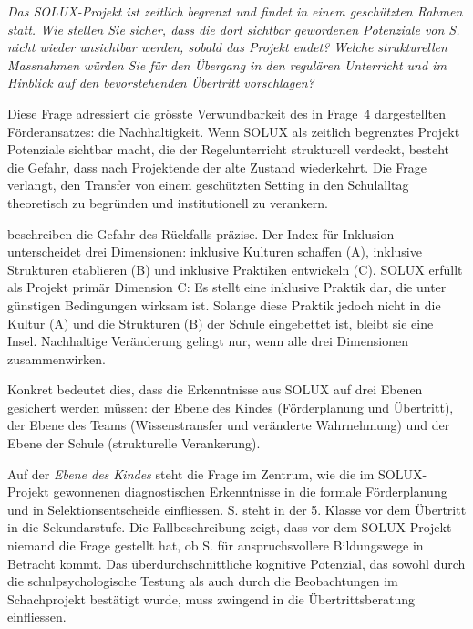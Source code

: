 \documentclass[ngerman, a4paper]{article}
\begin{document}
\begin{tcolorbox}[colback=gray!5, colframe=gray!50, title=Weiterführende Diskurslinie]
\itshape
Das SOLUX-Projekt ist zeitlich begrenzt und findet in einem geschützten Rahmen statt.
Wie stellen Sie sicher, dass die dort sichtbar gewordenen Potenziale von S. nicht
wieder unsichtbar werden, sobald das Projekt endet? Welche strukturellen Massnahmen
würden Sie für den Übergang in den regulären Unterricht und im Hinblick auf den
bevorstehenden Übertritt vorschlagen?
\end{tcolorbox}

Diese Frage adressiert die grösste Verwundbarkeit des in Frage~4 dargestellten
Förderansatzes: die Nachhaltigkeit. Wenn SOLUX als zeitlich begrenztes Projekt
Potenziale sichtbar macht, die der Regelunterricht strukturell verdeckt, besteht die
Gefahr, dass nach Projektende der alte Zustand wiederkehrt. Die Frage verlangt,
den Transfer von einem geschützten Setting in den Schulalltag theoretisch zu begründen
und institutionell zu verankern.

\textcite[Dim.\,A--C]{booth2019index} beschreiben die Gefahr des Rückfalls präzise.
Der Index für Inklusion unterscheidet drei Dimensionen: inklusive Kulturen schaffen
(A), inklusive Strukturen etablieren (B) und inklusive Praktiken entwickeln (C).
SOLUX erfüllt als Projekt primär Dimension C: Es stellt eine inklusive Praktik
dar, die unter günstigen Bedingungen wirksam ist. Solange diese Praktik jedoch
nicht in die Kultur (A) und die Strukturen (B) der Schule eingebettet ist, bleibt
sie eine Insel. Nachhaltige Veränderung gelingt nur, wenn alle drei Dimensionen
zusammenwirken.

Konkret bedeutet dies, dass die Erkenntnisse aus SOLUX auf drei Ebenen gesichert
werden müssen: der Ebene des Kindes (Förderplanung und Übertritt), der Ebene des
Teams (Wissenstransfer und veränderte Wahrnehmung) und der Ebene der Schule
(strukturelle Verankerung).

Auf der \textit{Ebene des Kindes} steht die Frage im Zentrum, wie die im
SOLUX-Projekt gewonnenen diagnostischen Erkenntnisse in die formale
Förderplanung und in Selektionsentscheide einfliessen. S. steht in der
5. Klasse vor dem Übertritt in die Sekundarstufe. Die Fallbeschreibung zeigt,
dass vor dem SOLUX-Projekt niemand die Frage gestellt hat, ob S. für
anspruchsvollere Bildungswege in Betracht kommt. Das überdurchschnittliche
kognitive Potenzial, das sowohl durch die schulpsychologische Testung als
auch durch die Beobachtungen im Schachprojekt bestätigt wurde, muss zwingend
in die Übertrittsberatung einfliessen.
\end{document}
